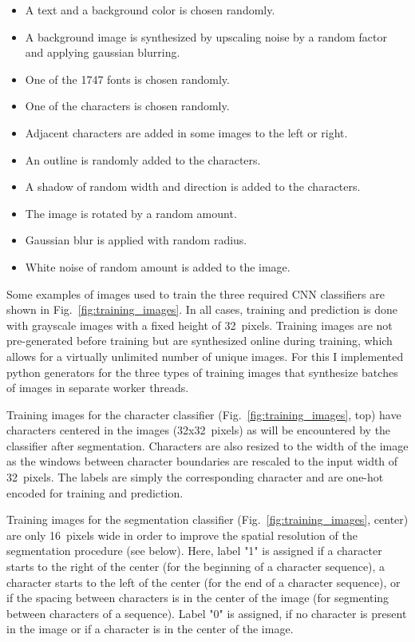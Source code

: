 \documentclass[12pt]{article}
\newcommand\figref[1]{Fig.~\ref{fig:#1}}
\begin{document}
\begin{itemize}
  \itemsep0em
  \item A text and a background color is chosen randomly.
  \item A background image is synthesized by upscaling noise by a random factor and applying gaussian blurring.
  \item One of the 1747 fonts is chosen randomly.
  \item One of the characters is chosen randomly.
  \item Adjacent characters are added in some images to the left or right.
  \item An outline is randomly added to the characters.
  \item A shadow of random width and direction is added to the characters.
  \item The image is rotated by a random amount.
  \item Gaussian blur is applied with random radius.
  \item White noise of random amount is added to the image.
\end{itemize}



Some examples of images used to train the three required CNN classifiers are shown in \figref{training_images}.
In all cases, training and prediction is done with grayscale images with a fixed height of 32~pixels.
Training images are not pre-generated before training but are synthesized online during training,
which allows for a virtually unlimited number of unique images.
For this I implemented python generators for the three types of training images that synthesize
batches of images in separate worker threads.

Training images for the character classifier (\figref{training_images}, top) have characters centered in the images (32x32~pixels) as will be encountered
by the classifier after segmentation.
%
Characters are also resized to the width of the image as the windows between character boundaries are rescaled to the
input width of 32~pixels.
%
The labels are simply the corresponding character and are one-hot encoded for training and prediction.


Training images for the segmentation classifier (\figref{training_images}, center) are only 16~pixels wide in order to improve the spatial resolution of the segmentation procedure (see below).
%
Here, label "1" is assigned if a character starts to the right of the center (for the beginning of a character sequence),
a character starts to the left of the center (for the end of a character sequence), or if the spacing
between characters is in the center of the image (for segmenting between characters of a sequence).
%
Label "0" is assigned, if no character is present in the image or if a character is in the center of the image.
\end{document}
